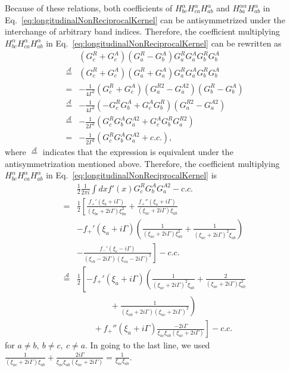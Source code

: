 \documentclass[twocolumn,superscriptaddress]{revtex4-1}
\begin{document}
Because of these relations, both coefficients of $H_{bc}^\alpha H_{ca}^\alpha H_{ab}^\alpha$ and $H_{ba}^{\alpha\alpha} H_{ab}^\alpha$ in Eq.~\eqref{eq:longitudinalNonReciprocalKernel} can be antisymmetrized under the interchange of arbitrary band indices.
Therefore, the coefficient multiplying $H_{bc}^\alpha H_{ca}^\alpha H_{ab}^\alpha$ in Eq.~\eqref{eq:longitudinalNonReciprocalKernel} can be rewritten as
\begin{align}
  &(G^R_c+G^A_c) (G^R_a-G^A_b)G^R_a G^A_a G^R_b G^A_b \nonumber \\
\overset{\mathcal{A}}{=} &(G^R_c+G^A_c) (G^R_a+G^A_a)G^R_a G^A_a G^R_b G^A_b \nonumber \\
=&-\frac{1}{4\Gamma^2}(G^R_c+G^A_c) (G^{R2}_a-G^{A2}_a)(G^{R}_b-G^{A}_b) \nonumber \\
\overset{\mathcal{A}}{=} &-\frac{1}{4\Gamma^2}(-G^R_c G^A_b+G^A_c G^R_b) (G^{R2}_a-G^{A2}_a)\nonumber \\
\overset{\mathcal{A}}{=} &-\frac{1}{2\Gamma^2}(G^R_c G^A_b G^{A2}_a+G^A_c G^R_b G^{R2}_a) \nonumber \\
=&-\frac{1}{2\Gamma^2}(G^R_c G^A_b G^{A2}_a+c.c.),
\end{align}
where $\overset{\mathcal{A}}{=}$ indicates that the expression is equivalent under the antisymmetrization mentioned above.
Therefore, the coefficient multiplying $H_{bc}^\alpha H_{ca}^\alpha H_{ab}^\alpha$ in Eq.~\eqref{eq:longitudinalNonReciprocalKernel} is
\begin{align}
  &\frac{1}{2}\frac{1}{2\pi i}\int dx f'(x)G^R_c G^A_b G^{A2}_a -c.c.\nonumber \\
  =&\frac{1}{2}\left[\frac{f_+'(\xi_b+i\Gamma)}{(\xi_{bc}+2i\Gamma)\xi_{ba}^2}+\frac{f_+''(\xi_a+i\Gamma)}{(\xi_{ac}+2i\Gamma)\xi_{ab}}\right. \nonumber \\
  &-f_+'(\xi_a+i\Gamma)\left(\frac{1}{(\xi_{ac}+2i\Gamma)\xi_{ab}^2}+\frac{1}{(\xi_{ac}+2i\Gamma)^2\xi_{ab}}\right) \nonumber \\
  &\left.-\frac{f_-'(\xi_c-i\Gamma)}{(\xi_{cb}-2i\Gamma)(\xi_{ca}-2i\Gamma)^2}\right]-c.c. \nonumber \\
  \overset{\mathcal{A}}{=}&\frac{1}{2}\left[
    -f_+'(\xi_a+i\Gamma)\left(
      \frac{1}{(\xi_{ac}+2i\Gamma)^2\xi_{ab}}+\frac{2}{(\xi_{ac}+2i\Gamma)\xi_{ab}^2} \right. \right. \nonumber \\
      &\left. \qquad \qquad+\frac{1}{(\xi_{ab}+2i\Gamma)(\xi_{ac}+2i\Gamma)^2}
    \right) \nonumber \\
   & \left. \qquad +f_+''(\xi_a+i\Gamma)\frac{-2i\Gamma}{\xi_{ac} \xi_{ab} (\xi_{ac}+2i\Gamma)} 
  \right]-c.c.
\end{align}
for $a\neq b,\ b\neq c,\ c\neq a$.
In going to the last line, we used $\frac{1}{(\xi_{ac}+2i\Gamma)\xi_{ab}}+\frac{2i\Gamma}{\xi_{ac}\xi_{ab}(\xi_{ac}+2i\Gamma)}=\frac{1}{\xi_{ac}\xi_{ab}}$.
\end{document}
